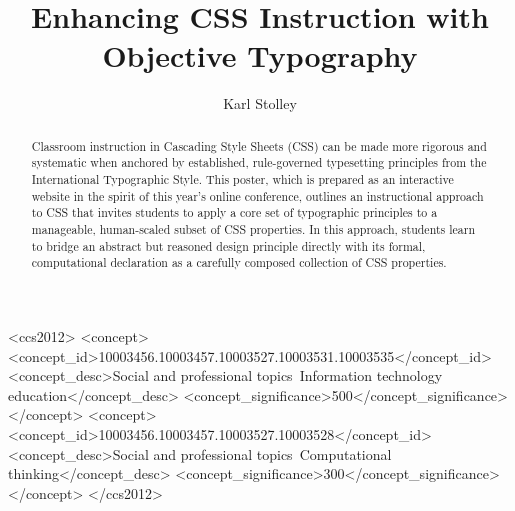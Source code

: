 \documentclass[sigconf]{acmart}
\begin{document}
\title{Enhancing CSS Instruction with Objective Typography}

\author{Karl Stolley}


\begin{abstract}
	Classroom instruction in Cascading Style Sheets (CSS) can be made more rigorous and systematic when anchored by established, rule-governed typesetting principles from the International Typographic Style. This poster, which is prepared as an interactive website in the spirit of this year’s online conference, outlines an instructional approach to CSS that invites students to apply a core set of typographic principles to a manageable, human-scaled subset of CSS properties. In this approach, students learn to bridge an abstract but reasoned design principle directly with its formal, computational declaration as a carefully composed collection of CSS properties.
\end{abstract}

\begin{CCSXML}
<ccs2012>
<concept>
<concept_id>10003456.10003457.10003527.10003531.10003535</concept_id>
<concept_desc>Social and professional topics~Information technology education</concept_desc>
<concept_significance>500</concept_significance>
</concept>
<concept>
<concept_id>10003456.10003457.10003527.10003528</concept_id>
<concept_desc>Social and professional topics~Computational thinking</concept_desc>
<concept_significance>300</concept_significance>
</concept>
</ccs2012>
\end{CCSXML}




\maketitle
\end{document}
